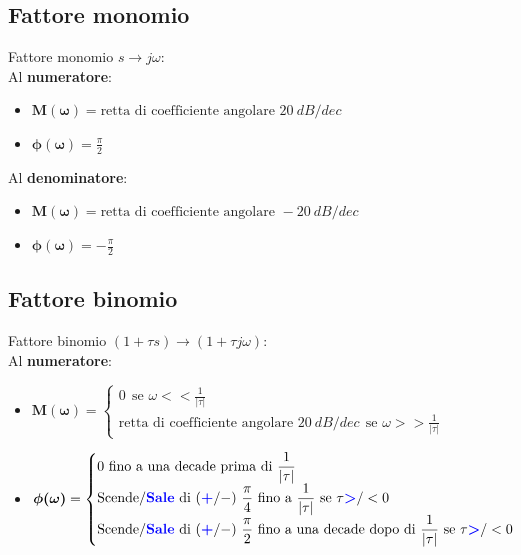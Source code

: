 \documentclass{report}
\theoremstyle{nostyle}
\begin{document}
\subsection{Fattore monomio}
Fattore monomio $s\to j\omega$:\smallskip\\
Al \textbf{numeratore}:
\begin{itemize}
    \item $\bm{M(\omega)} = \text{retta di coefficiente angolare } 20\ dB/dec$
    \item $\bm{\phi(\omega)} =  \displaystyle \frac{\pi}{2}$
\end{itemize}

\noindent Al \textbf{denominatore}:
\begin{itemize}
    \item $\bm{M(\omega)} = \text{retta di coefficiente angolare } -20\ dB/dec$
    \item $\bm{\phi(\omega)} =\displaystyle -\frac{\pi}{2}$
\end{itemize}


\subsection{Fattore binomio}
Fattore binomio $(1+\tau s) \to (1+ \tau j\omega)$:\smallskip\\
Al \textbf{numeratore}:
\begin{itemize}
    \item $\bm{M(\omega)} = \begin{cases}
        0 \ \ \text{se } \omega << \displaystyle \frac{1}{|\tau|}\\
        \text{retta di coefficiente angolare } 20\ dB/dec \ \ \text{se } \omega >>  \displaystyle\frac{1}{|\tau|}
    \end{cases}$
    \item $\bm{\phi(\omega)} = \begin{cases}
        0 \ \text{fino a una decade prima di } \displaystyle \frac{1}{|\tau|}\\
        \text{Scende/\textcolor{blue}{\textbf{Sale}} di } (\textcolor{blue}{\bm{+}}/-)\  \displaystyle \frac{\pi}{4} \ \text{fino a } \displaystyle \frac{1}{|\tau|}  \ \text{se } \tau \textcolor{blue}{\bm{>}}/< 0 \\
        \text{Scende/\textcolor{blue}{\textbf{Sale}} di } (\textcolor{blue}{\bm{+}}/-)\  \displaystyle \frac{\pi}{2} \ \text{fino a una decade dopo di } \displaystyle \frac{1}{|\tau|}  \ \text{se } \tau \textcolor{blue}{\bm{>}}/< 0 \\

    \end{cases}$
\end{itemize}
\end{document}
